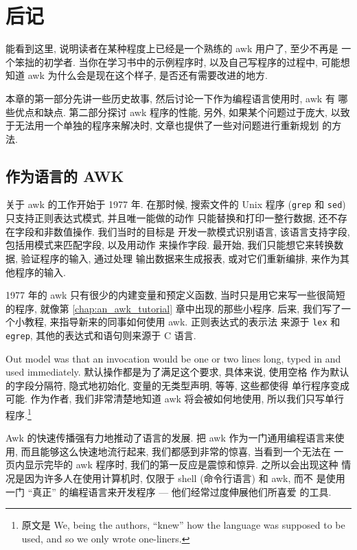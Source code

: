 \chapter{后记}
\label{chap:epilog}

能看到这里, 说明读者在某种程度上已经是一个熟练的 awk 用户了, 至少不再是
一个笨拙的初学者. 当你在学习书中的示例程序时, 以及自己写程序的过程中, 
可能想知道 awk 为什么会是现在这个样子, 是否还有需要改进的地方.

本章的第一部分先讲一些历史故事, 然后讨论一下作为编程语言使用时, awk 有
哪些优点和缺点. 第二部分探讨 awk 程序的性能, 另外, 如果某个问题过于庞大,
以致于无法用一个单独的程序来解决时, 文章也提供了一些对问题进行重新规划
的方法.

\section{作为语言的 AWK}
\label{sec:awk_as_a_language}

关于 awk 的工作开始于 1977 年. 在那时候, 搜索文件的 Unix 程序
(\texttt{grep} 和 \texttt{sed}) 只支持正则表达式模式, 并且唯一能做的动作
只能替换和打印一整行数据, 还不存在字段和非数值操作. 我们当时的目标是
开发一款模式识别语言, 该语言支持字段, 包括用模式来匹配字段, 以及用动作
来操作字段. 最开始, 我们只能想它来转换数据, 验证程序的输入, 通过处理
输出数据来生成报表, 或对它们重新编排, 来作为其他程序的输入.

1977 年的 awk 只有很少的内建变量和预定义函数, 当时只是用它来写一些很简短
的程序, 就像第 \ref{chap:an_awk_tutorial} 章中出现的那些小程序. 后来,
我们写了一个小教程, 来指导新来的同事如何使用 awk. 正则表达式的表示法
来源于 \texttt{lex} 和 \texttt{egrep}, 其他的表达式和语句则来源于 C
语言.

Out model was that an invocation would be one or two lines long, typed in
and used immediately. 默认操作都是为了满足这个要求, 具体来说, 使用空格
作为默认的字段分隔符, 隐式地初始化, 变量的无类型声明, 等等, 这些都使得
单行程序变成可能. 作为作者, 我们非常清楚地知道 awk 将会被如何地使用,
所以我们只写单行程序.\footnote{原文是 We, being the authors, ``knew''
    how the language was supposed to be used, and so we only wrote
one-liners.}

Awk 的快速传播强有力地推动了语言的发展. 把 awk 作为一门通用编程语言来使用,
而且能够这么快速地流行起来, 我们都感到非常的惊喜, 当看到一个无法在
一页内显示完毕的 awk 程序时, 我们的第一反应是震惊和惊异. 之所以会出现这种
情况是因为许多人在使用计算机时, 仅限于 shell (命令行语言) 和 awk, 而不
是使用一门 ``真正'' 的编程语言来开发程序 --- 他们经常过度伸展他们所喜爱
的工具.

